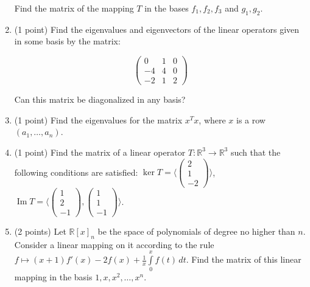 \documentclass{article}
\begin{document}
\begin{enumerate}
Find the matrix of the mapping $T$ in the bases $f_1, f_2, f_3$ and $g_1, g_2$.

\item (1 point) Find the eigenvalues and eigenvectors of the linear operators 
given in some basis by the matrix:

\[
\begin{pmatrix}
0 & 1 & 0 \\
-4 & 4 & 0 \\
-2 & 1 & 2
\end{pmatrix}
\]

Can this matrix be diagonalized in any basis?

\item (1 point) Find the eigenvalues for the matrix $x^Tx$, where $x$ is a row $(a_1, \dots, a_n)$.

\item (1 point) Find the matrix of a linear operator $T: \mathbb{R}^3 \to \mathbb{R}^3$ such that 
the following conditions are satisfied: 
$\ker T = \langle \begin{pmatrix} 2 \\ 1 \\ -2 \end{pmatrix} \rangle$, 
$\operatorname{Im} T = \langle \begin{pmatrix} 1 \\ 2 \\ -1 \end{pmatrix}, 
\begin{pmatrix} 1 \\ 1 \\ -1 \end{pmatrix} \rangle$.

\item (2 points) Let $\mathbb{R}[x]_n$ be the space of polynomials of degree 
no higher than $n$. Consider a linear mapping on it according to the rule 
$f \mapsto (x+1)f'(x)-2f(x)+ \frac{1}{x} \int\limits_0^x f(t) \, dt$. 
Find the matrix of this linear mapping in the basis $1, x, x^2, \dots, x^n$.
\end{enumerate}
\end{document}
